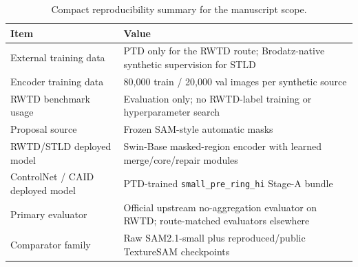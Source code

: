 \begin{table}[t]
\centering
\small
\begin{tabularx}{\textwidth}{@{}p{}X@{}}
\toprule
Item & Value \\
\midrule
External training data & PTD only for the RWTD route; Brodatz-native synthetic supervision for STLD \\
Encoder training data & 80{,}000 train / 20{,}000 val images per synthetic source \\
RWTD benchmark usage & Evaluation only; no RWTD-label training or hyperparameter search \\
Proposal source & Frozen SAM-style automatic masks \\
RWTD/STLD deployed model & Swin-Base masked-region encoder with learned merge/core/repair modules \\
ControlNet / CAID deployed model & PTD-trained \texttt{small\_pre\_ring\_hi} Stage-A bundle \\
Primary evaluator & Official upstream no-aggregation evaluator on RWTD; route-matched evaluators elsewhere \\
Comparator family & Raw SAM2.1-small plus reproduced/public TextureSAM checkpoints \\
\bottomrule
\end{tabularx}
\caption{Compact reproducibility summary for the manuscript scope.}
\label{tab:compact_repro}
\end{table}
